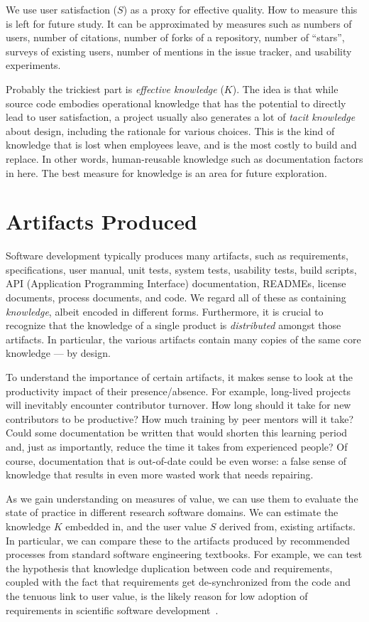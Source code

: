 \documentclass[sigconf, authorversion, nonacm]{acmart}
\begin{document}
We use user satisfaction ($S$) as a proxy for effective quality. How to 
measure this is left for future study. It can be approximated by measures
such as numbers of users, number of citations, number
of forks of a repository, number of ``stars'', surveys of existing users,
number of mentions in the issue tracker, and usability experiments.

Probably the trickiest part is \emph{effective knowledge} ($K$). The idea
is that while source code embodies operational knowledge that has the
potential to directly lead to user satisfaction, a project usually also
generates a lot of \emph{tacit knowledge} about design, including the
rationale for various choices. This is the kind of knowledge that is lost
when employees leave, and is the most costly to build and replace.
In other words, human-reusable knowledge such as documentation factors in
here.  The best measure for knowledge is an area for future exploration.

\section{Artifacts Produced}

Software development typically produces many artifacts, such as
requirements, specifications, user manual, unit
tests, system tests, usability tests, build scripts, API (Application
Programming Interface) documentation, READMEs, license documents, process
documents, and code. We regard all of these as containing
\emph{knowledge}, albeit encoded in different forms. Furthermore, it is
crucial to recognize that the knowledge of a single product is 
\emph{distributed} amongst those artifacts. In particular, the various
artifacts contain many copies of the same core knowledge --- by design.

To understand the importance of certain artifacts, it makes sense to look
at the productivity impact of their presence/absence. For example,
long-lived projects will inevitably encounter contributor turnover. How long
should it take for new contributors to be productive? How much training by
peer mentors will it take? Could some documentation be written that would
shorten this learning period and, just as importantly, reduce the time it
takes from experienced people? Of course, documentation that is out-of-date
could be even worse: a false sense of knowledge that results in even more
wasted work that needs repairing.

As we gain understanding on measures of value, we can use them to evaluate the
state of practice in different research software domains. We can estimate the
knowledge $K$ embedded in, and the user value $S$ derived from, existing
artifacts. In particular, we can compare these to the artifacts produced by
recommended processes from standard software engineering textbooks. For example,
we can test the hypothesis that knowledge duplication between code and requirements, coupled with the fact
that requirements get de-synchronized from the code and the tenuous link to
user value, is the likely reason for low adoption of requirements in
scientific software development~\cite{HeatonAndCarver2015}.
\end{document}
